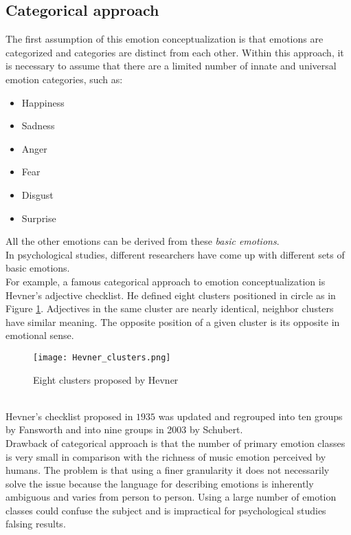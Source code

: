 \subsection{Categorical approach} \label{categorical_approach}
The first assumption of this emotion conceptualization is that emotions are categorized and categories are distinct from each other. Within this approach, it is necessary to assume that there are a limited number of innate and universal emotion categories, such as:
\begin{itemize}
	\item Happiness
	\item Sadness
	\item Anger
	\item Fear
	\item Disgust
	\item Surprise
\end{itemize}
All the other emotions can be derived from these \textit{basic emotions}.
\\
In psychological studies, different researchers have come up with different sets of basic emotions.
\\
For example, a famous categorical approach to emotion conceptualization is Hevner's adjective checklist. He defined eight clusters positioned in circle as in Figure \ref{fig:Hevner_clusters}. Adjectives in the same cluster are nearly identical, neighbor clusters have similar meaning. The opposite position of a given cluster is its opposite in emotional sense.
\begin{figure}[h]
    \centering
    \texttt{[image: Hevner\_clusters.png]} 
	\caption{Eight clusters proposed by Hevner}
    \label{fig:Hevner_clusters}
\end{figure}
\\
Hevner's checklist proposed in $1935$ was updated and regrouped into ten groups by Fansworth and into nine groups in 2003 by Schubert.
\\ \indent
Drawback of categorical approach is that the number of primary emotion classes is very small in comparison with the richness of music emotion perceived by humans. The problem is that using a finer granularity it does not necessarily solve the issue because the language for describing emotions is inherently ambiguous and varies from person to person. Using a large number of emotion classes could confuse the subject and is impractical for psychological studies falsing results.

